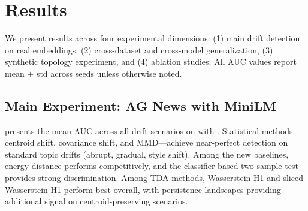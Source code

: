 \section{Results}
\label{sec:results}

We present results across four experimental dimensions: (1) main drift detection on real embeddings, (2) cross-dataset and cross-model generalization, (3) synthetic topology experiment, and (4) ablation studies. All AUC values report mean $\pm$ std across seeds unless otherwise noted.

\subsection{Main Experiment: AG News with MiniLM}
\label{sec:main_results}

 presents the mean AUC across all drift scenarios on \agnews with \minilm. Statistical methods---centroid shift, covariance shift, and MMD---achieve near-perfect detection on standard topic drifts (abrupt, gradual, style shift). Among the new baselines, energy distance performs competitively, and the classifier-based two-sample test provides strong discrimination. Among TDA methods, Wasserstein H1 and sliced Wasserstein H1 perform best overall, with persistence landscapes providing additional signal on centroid-preserving scenarios.

